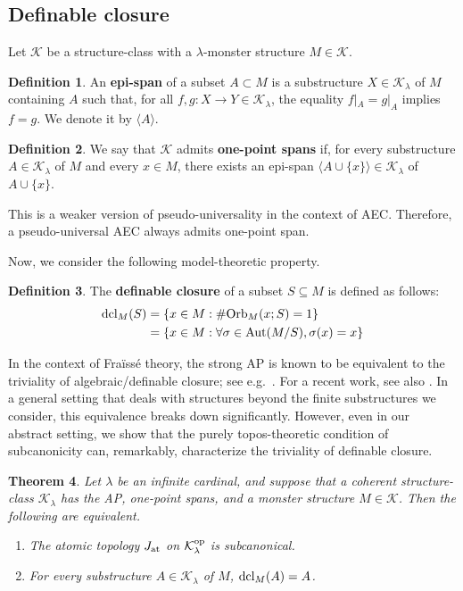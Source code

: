 \documentclass[10pt]{amsart}
\numberwithin{equation}{section}
\theoremstyle{plain}
\newtheorem{theorem}{Theorem}[section]
\theoremstyle{definition}
\newtheorem{definition}[theorem]{Definition}
\newcommand{\K}{\mathcal{K}}
\newcommand{\pair}[1]{\langle #1 \rangle}
\begin{document}
\subsection{Definable closure}

Let $\K$ be a structure-class with a $\lambda$-monster structure $M\in\K$.

\begin{definition}
An {\bf epi-span} of a subset $A\subset M$ is a substructure $X\in\K_\lambda$ of $M$ containing $A$ such that, for all $f,g\colon X\to Y\in\K_\lambda$, the equality $f|_A=g|_A$ implies $f=g$.
We denote it by $\pair{A}$.
\end{definition}



\begin{definition}
We say that $\K$ admits {\bf one-point spans} if, for every substructure $A\in\K_\lambda$ of $M$ and every $x\in M$, there exists an epi-span $\pair{A\cup\{x\}}\in\K_\lambda$ of $A\cup\{x\}$.
\end{definition}

This is a weaker version of pseudo-universality \cite{Vas17} in the context of AEC.
Therefore, a pseudo-universal AEC always admits one-point span.

Now, we consider the following model-theoretic property.

\begin{definition}
The {\bf definable closure} of a subset $S\subseteq M$ is defined as follows:
\begin{align*}
{\rm dcl}_M(S)&=\{x\in M:\#{\rm Orb}_M(x;S)=1\}\\
&=\{x\in M:\forall \sigma\in{\rm Aut}(M/S),\sigma(x)=x\}
\end{align*}
\end{definition}

In the context of Fra\"{i}ss\'e theory, the strong AP is known to be equivalent to the triviality of algebraic/definable closure; see e.g.~\cite[Section 7.1]{Hod93}.
For a recent work, see also \cite[Corollary 5.11]{YoZa26}.
In a general setting that deals with structures beyond the finite substructures we consider, this equivalence breaks down significantly.
However, even in our abstract setting, we show that the purely topos-theoretic condition of subcanonicity can, remarkably, characterize the triviality of definable closure.

\begin{theorem}\label{thm:subcanonical-definably-closed}
Let $\lambda$ be an infinite cardinal, and suppose that a coherent structure-class $\K_\lambda$ has the AP, one-point spans, and a monster structure $M\in\K$.
Then the following are equivalent.
\begin{enumerate}
\item The atomic topology $J_{\rm at}$ on $\K_\lambda^{\rm op}$ is subcanonical.
\item For every substructure $A\in\K_\lambda$ of $M$, ${\rm dcl}_M(A)=A$.
\end{enumerate}
\end{theorem}
\end{document}
